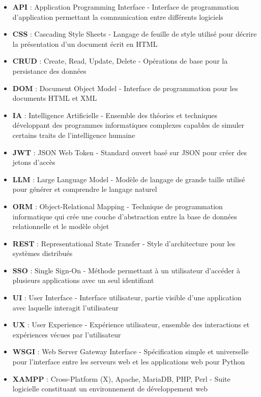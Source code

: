 \begin{itemize}
  \item \textbf{API} : Application Programming Interface - Interface de programmation d'application permettant la communication entre différents logiciels
  
  \item \textbf{CSS} : Cascading Style Sheets - Langage de feuille de style utilisé pour décrire la présentation d'un document écrit en HTML
  
  \item \textbf{CRUD} : Create, Read, Update, Delete - Opérations de base pour la persistance des données
  
  \item \textbf{DOM} : Document Object Model - Interface de programmation pour les documents HTML et XML
  
  \item \textbf{IA} : Intelligence Artificielle - Ensemble des théories et techniques développant des programmes informatiques complexes capables de simuler certains traits de l'intelligence humaine
  
  \item \textbf{JWT} : JSON Web Token - Standard ouvert basé sur JSON pour créer des jetons d'accès
  
  \item \textbf{LLM} : Large Language Model - Modèle de langage de grande taille utilisé pour générer et comprendre le langage naturel
  
  \item \textbf{ORM} : Object-Relational Mapping - Technique de programmation informatique qui crée une couche d'abstraction entre la base de données relationnelle et le modèle objet
  
  \item \textbf{REST} : Representational State Transfer - Style d'architecture pour les systèmes distribués
  
  \item \textbf{SSO} : Single Sign-On - Méthode permettant à un utilisateur d'accéder à plusieurs applications avec un seul identifiant
  
  \item \textbf{UI} : User Interface - Interface utilisateur, partie visible d'une application avec laquelle interagit l'utilisateur
  
  \item \textbf{UX} : User Experience - Expérience utilisateur, ensemble des interactions et expériences vécues par l'utilisateur
  
  \item \textbf{WSGI} : Web Server Gateway Interface - Spécification simple et universelle pour l'interface entre les serveurs web et les applications web pour Python
  
  \item \textbf{XAMPP} : Cross-Platform (X), Apache, MariaDB, PHP, Perl - Suite logicielle constituant un environnement de développement web
\end{itemize}

